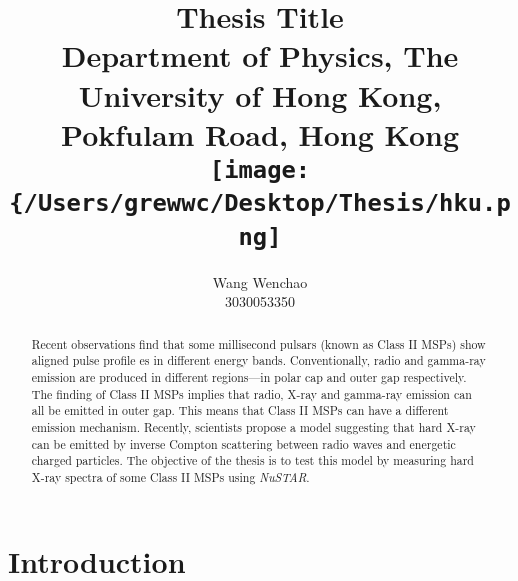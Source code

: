 \documentclass[12pt]{report}
\title{\textbf{Thesis Title}\\ \vspace{1cm}
			{\large Department of Physics, The University of Hong Kong, Pokfulam Road, Hong Kong}\\ \vspace{1cm}
			{\texttt{[image: \{/Users/grewwc/Desktop/Thesis/hku.png]}}}\\ \vspace{3cm}
}
\date{}
\author{Wang Wenchao  \\3030053350}
\begin{document}
\maketitle
\tableofcontents{}
\begin{abstract}
    \normalsize
    Recent observations find that some millisecond pulsars (known as Class II MSPs) show aligned pulse profile
    es in 
    different energy bands. Conventionally, radio and gamma-ray emission are produced in different 
    regions---in polar cap 
    and outer gap respectively. The finding of Class II MSPs implies that radio, X-ray and gamma-ray 
    emission 
    can all be emitted in outer gap. This means that Class II MSPs can have a different emission mechanism. 
    Recently, 
    scientists propose a model suggesting that hard X-ray can be emitted by inverse Compton scattering 
    between radio
    waves and energetic charged particles. The objective of the thesis is to test this model by measuring 
    hard X-ray 
    spectra of some Class II MSPs using \textit{NuSTAR}. 
\end{abstract}
			
		
		
\chapter{Introduction}   	   
\end{document}
